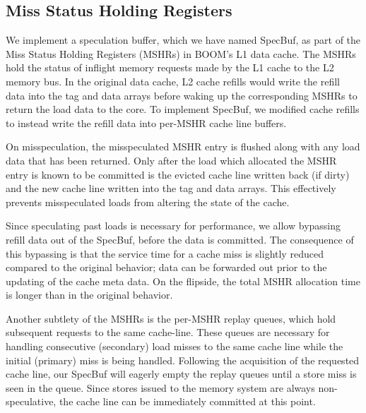 \subsection{Miss Status Holding Registers}
We implement a speculation buffer, which we have named SpecBuf, as part of the Miss Status Holding Registers (MSHRs) in BOOM's L1 data cache. The MSHRs hold the status of inflight memory requests made by the L1 cache to the L2 memory bus.
In the original data cache, L2 cache refills would write the refill data into the tag and data arrays before waking up the corresponding MSHRs to return the load data to the core.
To implement SpecBuf, we modified cache refills to instead write the refill data into per-MSHR cache line buffers.

On misspeculation, the misspeculated MSHR entry is flushed along with any load data that has been returned. Only after the load which allocated the MSHR entry is known to be committed is the evicted cache line written back (if dirty) and the new cache line written into the tag and data arrays. This effectively prevents misspeculated loads from altering the state of the cache.

Since speculating past loads is necessary for performance, we allow bypassing refill data out of the SpecBuf, before the data is committed. The consequence of this bypassing is that the service time for a cache miss is slightly reduced compared to the original behavior; data can be forwarded out prior to the updating of the cache meta data. On the flipside, the total MSHR allocation time is longer than in the original behavior.

Another subtlety of the MSHRs is the per-MSHR replay queues, which hold subsequent requests to the same cache-line. These queues are necessary for handling consecutive (secondary) load misses to the same cache line while the initial (primary) miss is being handled. Following the acquisition of the requested cache line, our SpecBuf will eagerly empty the replay queues until a store miss is seen in the queue. Since stores issued to the memory system are always non-speculative, the cache line can be immediately committed at this point.

